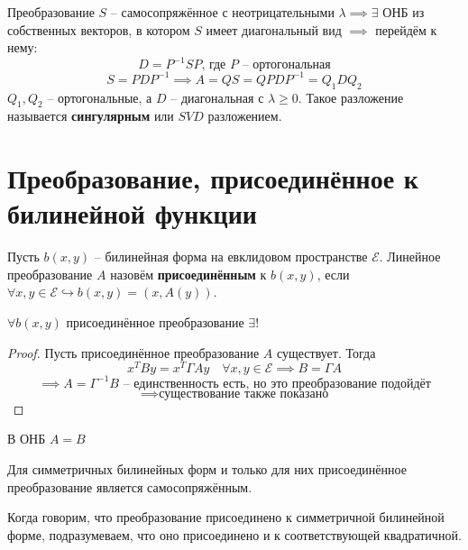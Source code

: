 \documentclass[11pt]{article}
\begin{document}
\begin{definition}
  Преобразование $S$ -- самосопряжённое с неотрицательными $\lambda 
  \implies \exists$ ОНБ из собственных векторов, в котором $S$ имеет 
  диагональный вид $\implies$ перейдём к нему:
  \[D = P^{-1}SP \text{, где } P \text{ -- ортогональная}\]
  \[S = PDP^{-1} \implies A = QS = QPDP^{-1} = Q_1DQ_2\] 
  $Q_1, Q_2$ -- ортогональные, а $D$ -- диагональная с $\lambda \geq 0$.
  Такое разложение называется \textbf{сингулярным} или $SVD$ разложением.
\end{definition}

\section{Преобразование, присоединённое к билинейной функции}

\begin{definition}
  Пусть $b(x, y)$ -- билинейная форма на евклидовом пространстве $\mathcal{E}$. 
  Линейное преобразование $A$ назовём \textbf{присоединённым} к $b(x, y)$, 
  если $\forall x, y \in \mathcal{E} \hookrightarrow b(x, y) = (x, A(y))$.
\end{definition}

\begin{theorem}
  $\forall b(x, y)$ присоединённое преобразование $\exists !$ 
\end{theorem}

\begin{proof}
  Пусть присоединённое преобразование $A$ существует. Тогда 
  \[x^TBy = x^T \Gamma Ay \quad \forall x, y \in \mathcal{E} \implies B = 
  \Gamma A\]
  \[\implies A = \Gamma^{-1}B \text{ -- единственность есть, но это 
  преобразование подойдёт}\]
  \[\implies \text{существование также показано}\]
\end{proof}

\begin{remark}
  В ОНБ $A = B$
\end{remark}

\begin{lemma}
  Для симметричных билинейных форм и только для них присоединённое 
  преобразование является самосопряжённым.
\end{lemma}

\begin{remark}
  Когда говорим, что преобразование присоединено к симметричной билинейной 
  форме, подразумеваем, что оно присоединено и к соответствующей квадратичной.
\end{remark}
\end{document}
